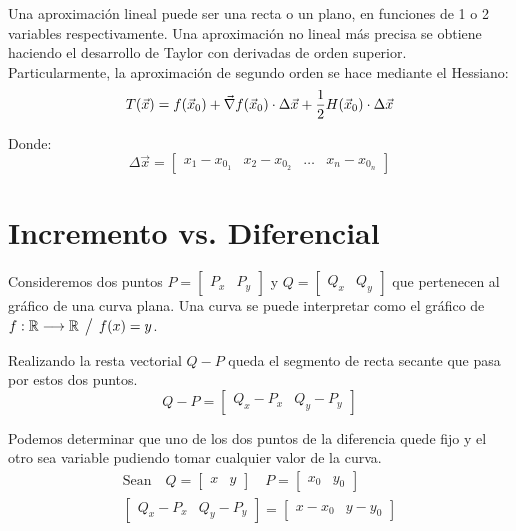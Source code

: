 \documentclass[a5paper,12pt,twoside]{book}
\begin{document}

Una aproximación lineal puede ser una recta o un plano, en funciones de 1 o 2 variables respectivamente. Una aproximación no lineal más precisa se obtiene haciendo el desarrollo de Taylor con derivadas de orden superior. Particularmente, la aproximación de segundo orden se hace mediante el Hessiano:
\begin{equation*}
    T(\Vec{x}) = f(\Vec{x}_0) + \Vec{\nabla} f(\Vec{x}_0) \cdot \Delta \Vec{x} + \frac{1}{2} H(\Vec{x}_0) \cdot \Delta \Vec{x}
\end{equation*}

Donde:
\begin{equation*}
    \Delta \Vec{x} = \begin{bmatrix} x_1-x_{0_1} & x_2-x_{0_2} & \dots & x_n-x_{0_n} \end{bmatrix}
\end{equation*}


\section{Incremento vs. Diferencial}

Consideremos dos puntos $P=\begin{bmatrix} P_x & P_y \end{bmatrix}$ y $Q=\begin{bmatrix} Q_x & Q_y \end{bmatrix}$ que pertenecen al gráfico de una curva plana. Una curva se puede interpretar como el gráfico de $f:\mathbb{R} \longrightarrow \mathbb{R} \hspace{1ex} \big/ \hspace{1ex} f(x)=y$.

Realizando la resta vectorial $Q-P$ queda el segmento de recta secante que pasa por estos dos puntos.
\begin{equation*}
    Q-P = \begin{bmatrix} Q_x-P_x & Q_y-P_y \end{bmatrix}
\end{equation*}

Podemos determinar que uno de los dos puntos de la diferencia quede fijo y el otro sea variable pudiendo tomar cualquier valor de la curva.
\begin{gather*}
    \textrm{Sean} \quad
    Q = \begin{bmatrix}x&y\end{bmatrix} \quad P = \begin{bmatrix}x_0&y_0\end{bmatrix}
    \\
    \begin{bmatrix}Q_x-P_x & Q_y-P_y\end{bmatrix} = \begin{bmatrix}x-x_0 & y-y_0\end{bmatrix}
\end{gather*}
\end{document}
